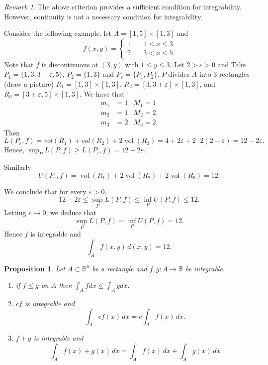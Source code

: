 \documentclass[11pt,openany]{book}
\theoremstyle{plain}
\newtheorem{proposition}{Proposition}[chapter]
\theoremstyle{definition}
\theoremstyle{remark}
\newtheorem{remark}{Remark}[chapter]
\newcommand{\R}{\mathbb{R}}
\newcommand{\set}[1]{\{ #1 \}}
\newcommand{\vol}{\operatorname{vol}}
\begin{document}
\begin{remark}
The above criterion provides a sufficient condition for integrability. However, continuity is not a necessary condition for integrability. 

Consider the following example. let $A = [1, 5] \times [1,3]$ and 
    $$f(x,y) = \begin{cases}
        1 \quad& 1 \le x \le 3 \\
        2 \quad& 3 < x \le 5
    \end{cases}$$
    Note that $f$ is discontinuous at $(3,y)$ with $1 \le y \le 3$. Let $2 > \varepsilon > 0$ and 
    Take $P_1 = \set{1,3, 3 + \varepsilon, 5}$, $P_2 = \set{1,3}$ and $P_\varepsilon=\{P_1,P_2\}$. $P$ divides $A$ into 3 rectangles (draw a picture) $R_1=[1,3]\times [1,3]$, $R_2=[3,3+\varepsilon]\times [1, 3]$, and $R_3=[3+\varepsilon, 5]
    \times [1,3]$.
    We have that 
    \begin{align*}
        m_1 &= 1 &M_1 = 1 \\
        m_2 &= 1 &M_2 = 2 \\
        m_3 &= 2 &M_3 = 2.
    \end{align*}
    Then
$$L(P_{\varepsilon},f)=vol(R_1)+vol(R_2)+2\vol(R_3)=4+2\varepsilon+2\cdot 2(2-\varepsilon)=12-2\varepsilon.$$
Hence, $\sup_P L(P,f)\geq L(P_{\varepsilon},f)=12-2\varepsilon.$

Similarly
$$U(P_\varepsilon,f)=\vol(R_1)+2\vol(R_2)+2\vol(R_3)=12.$$

We conclude that for every $\varepsilon>0$,
$$12-2\varepsilon\leq \sup_P L(P,f)\leq \inf_P U(P,f)\leq 12.$$
Letting $\varepsilon\to 0$, we deduce that
$$\sup_P L(P,f)= \inf_P U(P,f)=12.$$
Hence $f$ is integrable and 
$$\int_A f(x,y)\, d(x,y)=12.$$
 
\end{remark}

\begin{proposition}
    Let $A \subset \R^n$ be a rectangle and $f, g \colon A \to \R$ be integrable. 
    \begin{enumerate}
        \item if $f \le g$ on $A$ then $\int_A f dx \le \int_A g dx$. 
        \item $cf$ is integrable and $$\int_A cf(x)\,dx=c\int_A f(x)\,dx.$$
        \item $f +g$ is integrable and
        $$\int_A f(x) + g(x)\,  dx = \int_A f(x)\, dx + \int_A g(x)\, dx$$
    \end{enumerate}
\end{proposition}
\end{document}
